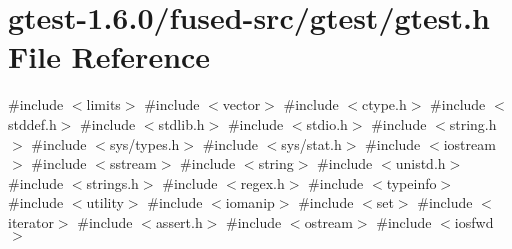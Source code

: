 \hypertarget{fused-src_2gtest_2gtest_8h}{\section{gtest-\/1.6.0/fused-\/src/gtest/gtest.h \-File \-Reference}
\label{d2/dc6/fused-src_2gtest_2gtest_8h}
}
{\ttfamily \#include $<$limits$>$}\*
{\ttfamily \#include $<$vector$>$}\*
{\ttfamily \#include $<$ctype.\-h$>$}\*
{\ttfamily \#include $<$stddef.\-h$>$}\*
{\ttfamily \#include $<$stdlib.\-h$>$}\*
{\ttfamily \#include $<$stdio.\-h$>$}\*
{\ttfamily \#include $<$string.\-h$>$}\*
{\ttfamily \#include $<$sys/types.\-h$>$}\*
{\ttfamily \#include $<$sys/stat.\-h$>$}\*
{\ttfamily \#include $<$iostream$>$}\*
{\ttfamily \#include $<$sstream$>$}\*
{\ttfamily \#include $<$string$>$}\*
{\ttfamily \#include $<$unistd.\-h$>$}\*
{\ttfamily \#include $<$strings.\-h$>$}\*
{\ttfamily \#include $<$regex.\-h$>$}\*
{\ttfamily \#include $<$typeinfo$>$}\*
{\ttfamily \#include $<$utility$>$}\*
{\ttfamily \#include $<$iomanip$>$}\*
{\ttfamily \#include $<$set$>$}\*
{\ttfamily \#include $<$iterator$>$}\*
{\ttfamily \#include $<$assert.\-h$>$}\*
{\ttfamily \#include $<$ostream$>$}\*
{\ttfamily \#include $<$iosfwd$>$}\*

